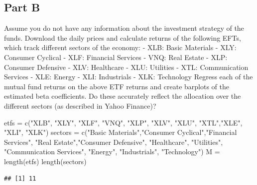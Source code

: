 \documentclass[
  oneside]{book}
\newenvironment{Shaded}{\begin{snugshade}}{\end{snugshade}}
\newcommand{\FunctionTok}[1]{\textcolor[rgb]{0.00,0.00,0.00}{#1}}
\newcommand{\NormalTok}[1]{#1}
\newcommand{\OtherTok}[1]{\textcolor[rgb]{0.56,0.35,0.01}{#1}}
\newcommand{\StringTok}[1]{\textcolor[rgb]{0.31,0.60,0.02}{#1}}
\begin{document}
\hypertarget{part-b-10}{%
\subsection{Part B}\label{part-b-10}}

Assume you do not have any information about the investment strategy of the funds. Download the daily prices and calculate returns of the following EFTs, which track different sectors of the economy:
- XLB: Basic Materials
- XLY: Consumer Cyclical
- XLF: Financial Services
- VNQ: Real Estate
- XLP: Consumer Defensive
- XLV: Healthcare
- XLU: Utilities
- XTL: Communication Services
- XLE: Energy
- XLI: Industrials
- XLK: Technology
Regress each of the mutual fund returns on the above ETF returns and create barplots of the estimated beta coefficients. Do these accurately reflect the allocation over the different sectors (as described in Yahoo Finance)?

\begin{Shaded}
\begin{Highlighting}[]
\NormalTok{etfs }\OtherTok{=} \FunctionTok{c}\NormalTok{(}\StringTok{"XLB"}\NormalTok{, }\StringTok{"XLY"}\NormalTok{, }\StringTok{"XLF"}\NormalTok{, }\StringTok{"VNQ"}\NormalTok{, }\StringTok{"XLP"}\NormalTok{, }\StringTok{"XLV"}\NormalTok{, }\StringTok{"XLU"}\NormalTok{, }\StringTok{"XTL"}\NormalTok{,}\StringTok{"XLE"}\NormalTok{, }\StringTok{"XLI"}\NormalTok{, }\StringTok{"XLK"}\NormalTok{)}
\NormalTok{sectors }\OtherTok{=} \FunctionTok{c}\NormalTok{(}\StringTok{"Basic Materials"}\NormalTok{,}\StringTok{"Consumer Cyclical"}\NormalTok{,}\StringTok{"Financial Services"}\NormalTok{,}
            \StringTok{"Real Estate"}\NormalTok{,}\StringTok{"Consumer Defensive"}\NormalTok{, }\StringTok{"Healthcare"}\NormalTok{, }\StringTok{"Utilities"}\NormalTok{,}
            \StringTok{"Communication Services"}\NormalTok{, }\StringTok{"Energy"}\NormalTok{, }\StringTok{"Industrials"}\NormalTok{, }\StringTok{"Technology"}\NormalTok{)}
\NormalTok{M }\OtherTok{=} \FunctionTok{length}\NormalTok{(etfs)}
\FunctionTok{length}\NormalTok{(sectors)}
\end{Highlighting}
\end{Shaded}

\begin{verbatim}
## [1] 11
\end{verbatim}
\end{document}
